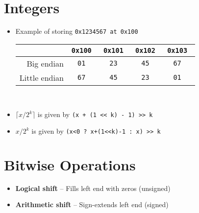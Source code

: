 \section{Integers}
\begin{itemize}[noitemsep, topsep=1pt]
    \item Example of storing \tt{0x1234567} at \tt{0x100} \\
    \begin{tabular}{| r || c | c | c | c |}
        \hline
                      & \tt{0x100} & \tt{0x101} & \tt{0x102} & \tt{0x103} \\ \hline
        Big endian    & \tt{01}    & \tt{23}    & \tt{45}    & \tt{67}    \\ \hline
        Little endian & \tt{67}    & \tt{45}    & \tt{23}    & \tt{01}    \\ \hline
    \end{tabular} \\
    \item $\lceil x/2^k \rceil$ is given by \tt{(x + (1 << k) - 1) >> k}
    \item $x/2^k$ is given by \tt{(x<0 ? x+(1<<k)-1 : x) >> k}
\end{itemize}
\vspace{-15pt}
\section{Bitwise Operations}
\begin{itemize}[noitemsep, topsep=1pt]
\item \textbf{Logical shift} -- Fills left end with zeros (unsigned)
\item \textbf{Arithmetic shift} -- Sign-extends left end (signed)
\end{itemize}
\vspace{-15pt}

